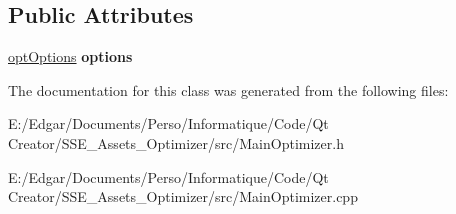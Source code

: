 \subsection*{Public Attributes}
\begin{DoxyCompactItemize}
\item 
\mbox{\label{class_main_optimizer_a64ae762b69f83964ab6712bcff897876}} 
\mbox{\hyperlink{structopt_options}{opt\+Options}} {\bfseries options}
\end{DoxyCompactItemize}


The documentation for this class was generated from the following files\+:\begin{DoxyCompactItemize}
\item 
E\+:/\+Edgar/\+Documents/\+Perso/\+Informatique/\+Code/\+Qt Creator/\+S\+S\+E\+\_\+\+Assets\+\_\+\+Optimizer/src/Main\+Optimizer.\+h\item 
E\+:/\+Edgar/\+Documents/\+Perso/\+Informatique/\+Code/\+Qt Creator/\+S\+S\+E\+\_\+\+Assets\+\_\+\+Optimizer/src/Main\+Optimizer.\+cpp\end{DoxyCompactItemize}
